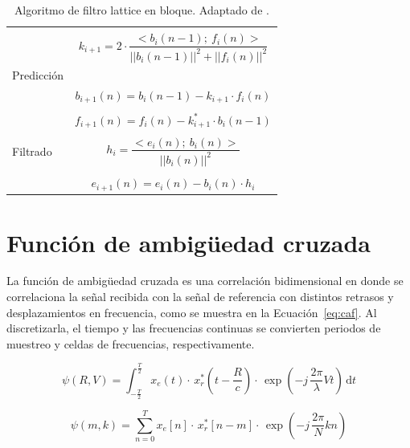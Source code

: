 \begin{table}[H]
    \caption[Algoritmo de filtro lattice en bloque.]{Algoritmo de filtro lattice en bloque. Adaptado de \cite{malanowski}.}
    \centering
    \begin{tabular}{|l|c|}
        \hline
        &\\
        &
        $k_{i+1} = 2 \cdot \dfrac{< b_i(n-1);\ f_i(n)>}{|| b_i(n-1)||^2 + || f_i(n)||^2} $\\
        Predicción&\\
        &$b_{i+1}(n) = b_i(n-1) - k_{i+1} \cdot f_i(n)$\\
        &\\
        &$f_{i+1}(n) = f_i(n) - k_{i+1}^\ast \cdot  b_i(n-1)$\rule[-2.2ex]{0pt}{3.2ex}\\\hline
         &\\

        Filtrado&$h_i = \dfrac{<e_i(n);\ b_i(n)> }{|| b_i(n)||^2} $\\
        &\\
        &$e_{i+1}(n) = e_i(n) - b_i(n) \cdot h_i$\rule[-2.2ex]{0pt}{3.2ex}\\\hline
    \end{tabular}
    \centering

    \label{table:lattice}

\end{table}

\section{Función de ambigüedad cruzada}

La función de ambigüedad cruzada es una correlación bidimensional en donde se correlaciona la señal recibida con la señal de referencia con distintos retrasos y desplazamientos en frecuencia, como se muestra en la Ecuación~\ref{eq:caf}. Al discretizarla, el tiempo y las frecuencias continuas se convierten periodos de muestreo y celdas de frecuencias, respectivamente.

\begin{equation}
    \label{eq:caf}
    \psi(R,V) =
    \mathop{\int}_{-\tfrac{T}{2}}^{\tfrac{T}{2}}
    x_e(t) \cdot \,
    x_r^{\ast}\!\left(t - \frac{R}{c}\right) \cdot \,
    \exp\!\left(-j\,\frac{2\pi}{\lambda} V t\right)
    \,\mathrm{d}t
\end{equation}

\begin{equation}
    \label{eq:caf_dig}
    \psi(m,k) =
    \mathop{\sum}_{n = 0}^{T}
    x_e[n] \cdot \,
    x_r^{\ast}\!\left[n - m \right] \cdot \,
    \exp\!\left(-j\,\frac{2\pi}{N} k n\right)
\end{equation}

